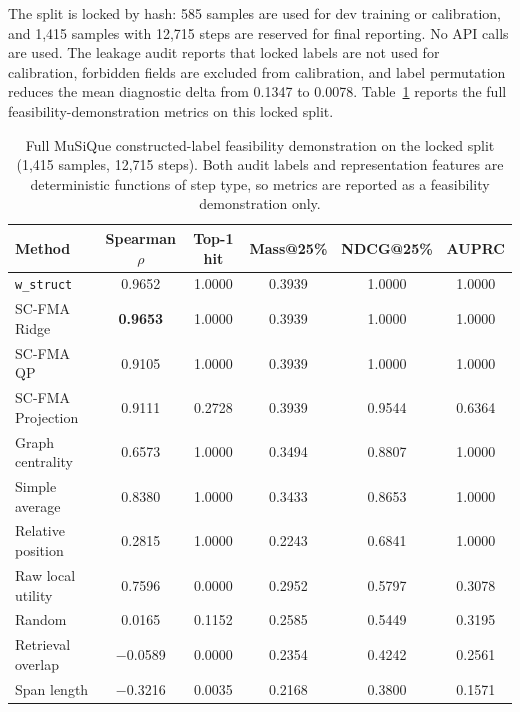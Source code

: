 \documentclass[a4paper,fleqn]{cas-sc}
\begin{document}
The split is locked by hash: 585 samples are used for dev training or calibration, and 1,415 samples with 12,715 steps are reserved for final reporting. No API calls are used. The leakage audit reports that locked labels are not used for calibration, forbidden fields are excluded from calibration, and label permutation reduces the mean diagnostic delta from 0.1347 to 0.0078. Table~\ref{tab:supp-musique-knowledge-audit} reports the full feasibility-demonstration metrics on this locked split.

\begin{table}[ht]
\caption{Full MuSiQue constructed-label feasibility demonstration on the locked split (1,415 samples, 12,715 steps). Both audit labels and representation features are deterministic functions of step type, so metrics are reported as a feasibility demonstration only.}
\label{tab:supp-musique-knowledge-audit}
\centering
\small
\begin{tabular}{lccccc}
\toprule
\textbf{Method} & \textbf{Spearman $\rho$} & \textbf{Top-1 hit} & \textbf{Mass@25\%} & \textbf{NDCG@25\%} & \textbf{AUPRC} \\
\midrule
\texttt{w\_struct} & 0.9652 & 1.0000 & 0.3939 & 1.0000 & 1.0000 \\
SC-FMA Ridge & \textbf{0.9653} & 1.0000 & 0.3939 & 1.0000 & 1.0000 \\
SC-FMA QP & 0.9105 & 1.0000 & 0.3939 & 1.0000 & 1.0000 \\
SC-FMA Projection & 0.9111 & 0.2728 & 0.3939 & 0.9544 & 0.6364 \\
Graph centrality & 0.6573 & 1.0000 & 0.3494 & 0.8807 & 1.0000 \\
Simple average & 0.8380 & 1.0000 & 0.3433 & 0.8653 & 1.0000 \\
Relative position & 0.2815 & 1.0000 & 0.2243 & 0.6841 & 1.0000 \\
Raw local utility & 0.7596 & 0.0000 & 0.2952 & 0.5797 & 0.3078 \\
Random & 0.0165 & 0.1152 & 0.2585 & 0.5449 & 0.3195 \\
Retrieval overlap & $-$0.0589 & 0.0000 & 0.2354 & 0.4242 & 0.2561 \\
Span length & $-$0.3216 & 0.0035 & 0.2168 & 0.3800 & 0.1571 \\
\bottomrule
\end{tabular}
\end{table}
\end{document}
